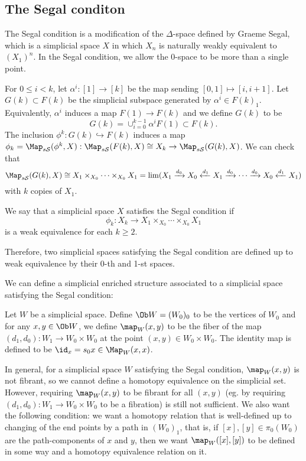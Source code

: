 \subsection{The Segal conditon}
The Segal condition is a modification of the $\Delta$-space defined by Graeme Segal, which is a simplicial space $X$ in which $X_n$ is naturally weakly equivalent to $(X_1)^n$. In the Segal condition, we allow the $0$-space to be more than a single point.

For $0\le i<k$, let $\alpha^i:[1]\to [k]$ be the map sending $[0,1]\mapsto [i,i+1]$. Let $G(k)\subset F(k)$ be the simplicial subspace generated by $\alpha^i\in F(k)_1$. Equivalently, $\alpha^i$ induces a map $F(1)\to F(k)$ and we define $G(k)$ to be
$$G(k)=\cup_{i=0}^{k-1}\alpha^iF(1)\subset F(k).$$
The inclusion $\phi^k:G(k)\hookrightarrow F(k)$ induces a map $\phi_k=\Map_{s\mathcal S}(\phi^k,X):\Map_{s\mathcal S}(F(k),X)\cong X_k\to\Map_{s\mathcal S}(G(k),X)$. We can check that
$$\Map_{s\mathcal S}(G(k),X)\cong X_1\times_{X_0}\cdots\times_{X_0}X_1=\lim(X_1\xrightarrow{d_0}X_0\xleftarrow{d_1}X_1\xrightarrow{d_0}\cdots\xrightarrow{d_0}X_0\xleftarrow{d_1}X_1)$$
with $k$ copies of $X_1$.

\begin{defin}
We say that a simplicial space $X$ satisfies the Segal condition if
\begin{equation} \label{segal}
\phi_k:X_k\to X_1\times_{X_0}\cdots\times_{X_0}X_1
\end{equation}
is a weak equivalence for each $k\ge 2$.
\end{defin}

Therefore, two simplicial spaces satisfying the Segal condition are defined up to weak equivalence by their 0-th and 1-st spaces.

We can define a simplicial enriched structure associated to a simplicial space satisfying the Segal condition:
\begin{defin}\label{simpcat}
Let $W$ be a simplicial space. Define $\Ob W=(W_0)_0$ to be the vertices of $W_0$ and for any $x,y\in\Ob W$, we define $\map_W(x,y)$ to be the fiber of the map $(d_1,d_0):W_1\to W_0\times W_0$ at the point $(x,y)\in W_0\times W_0$. The identity map is defined to be $\id_x=s_0x\in\Map_W(x,x)$.
\end{defin}
In general, for a simplicial space $W$ satisfying the Segal condition, $\map_W(x,y)$ is not fibrant, so we cannot define a homotopy equivalence on the simplicial set. However, requiring $\map_W(x,y)$ to be fibrant for all $(x,y)$ (eg. by requiring $(d_1,d_0):W_1\to W_0\times W_0$ to be a fibration) is still not sufficient. We also want the following condition: we want a homotopy relation that is well-defined up to changing of the end points by a path in $(W_0)_1$, that is, if $[x],[y]\in\pi_0(W_0)$ are the path-components of $x$ and $y$, then we want $\map_W([x],[y])$ to be defined in some way and a homotopy equivalence relation on it.


